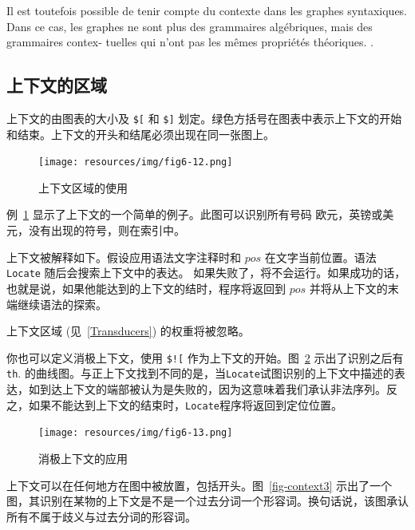 \bigskip
\noindent Il est toutefois possible de tenir compte du contexte dans les graphes syntaxiques. Dans
ce cas, les graphes ne sont plus des grammaires algébriques, mais des grammaires contex-
tuelles qui n’ont pas les mêmes propriétés théoriques.
.

\subsection{上下文的区域}
\index{\verb+$[+}
\index{\verb+$]+}
上下文的由图表的大小及
\verb+$[+ 和 \verb+$]+ 划定。绿色方括号在图表中表示上下文的开始和结束。上下文的开头和结尾必须出现在同一张图上。

\bigskip
\begin{figure}[!h]
\begin{center}
\texttt{[image: resources/img/fig6-12.png]}
\caption{上下文区域的使用\label{fig-context1}}
\end{center}
\end{figure}

\bigskip
\noindent 例~\ref{fig-context1} 显示了上下文的一个简单的例子。此图可以识别所有号码
欧元，英镑或美元，没有出现的符号，则在索引中。

\bigskip
\noindent 上下文被解释如下。假设应用语法文字注释时和 $pos$ 在文字当前位置。语法 \verb$Locate$ 随后会搜索上下文中的表达。 如果失败了，将不会运行。如果成功的话，也就是说，如果他能达到的上下文的结时，程序将返回到 $pos$ 并将从上下文的末端继续语法的探索。

\bigskip
\noindent 上下文区域 (见~\ref{Transducers}) 的权重将被忽略。

\bigskip
\noindent 你也可以定义消极上下文，使用
 \verb+$![+ 作为上下文的开始。图~\ref{fig-context2}
示出了识别之后有 \verb+th+.
 的曲线图。与正上下文找到不同的是，当\verb$Locate$试图识别的上下文中描述的表达，如到达上下文的端部被认为是失败的，因为这意味着我们承认非法序列。反之，如果不能达到上下文的结束时，\verb$Locate$程序将返回到定位位置。

\begin{figure}[!h]
\begin{center}
\texttt{[image: resources/img/fig6-13.png]}
\caption{消极上下文的应用\label{fig-context2}}
\end{center}
\end{figure}

\bigskip
\noindent 上下文可以在任何地方在图中被放置，包括开头。图~\ref{fig-context3} 示出了一个图，其识别在某物的上下文是不是一个过去分词一个形容词。换句话说，该图承认所有不属于歧义与过去分词的形容词。

